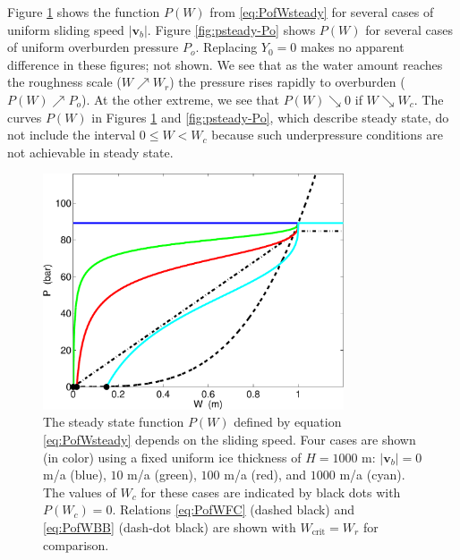\documentclass[11pt,final]{amsart}%
\newcommand\bv{\mathbf{v}}
\begin{document}
\newcommand{\upto}{ \!\!\nearrow\! }
\newcommand{\downto}{ \!\searrow\! }
Figure \ref{fig:psteady-vb} shows the function $P(W)$ from \eqref{eq:PofWsteady} for several cases of uniform sliding speed $|\bv_b|$.  Figure \ref{fig:psteady-Po} shows $P(W)$ for several cases of uniform overburden pressure $P_o$.  Replacing $Y_0=0$ makes no apparent difference in these figures; not shown.  We see that as the water amount reaches the roughness scale ($W\upto W_r$) the pressure rises rapidly to overburden ($P(W) \upto P_o$).  At the other extreme, we see that $P(W) \downto 0$ if $W \downto W_c$.  The curves $P(W)$ in Figures \ref{fig:psteady-vb} and \ref{fig:psteady-Po}, which describe steady state, do not include the interval $0\le W < W_c$ because such underpressure conditions are not achievable in steady state.

\begin{figure}[ht]
\includegraphics[width=3.5in,keepaspectratio=true]{psteady-vb}
\medskip
\caption{The steady state function $P(W)$ defined by equation \eqref{eq:PofWsteady} depends on the sliding speed.  Four cases are shown (in color) using a fixed uniform ice thickness of $H=1000$ m: $|\bv_b|=0$ m/a (blue), $10$ m/a (green), $100$ m/a (red), and $1000$ m/a (cyan).  The values of $W_c$ for these cases are indicated by black dots with $P(W_c)=0$.  Relations \eqref{eq:PofWFC} (dashed black) and \eqref{eq:PofWBB} (dash-dot black) are shown with $W_{\text{crit}}=W_r$ for comparison.}
\label{fig:psteady-vb}
\end{figure}
\end{document}
